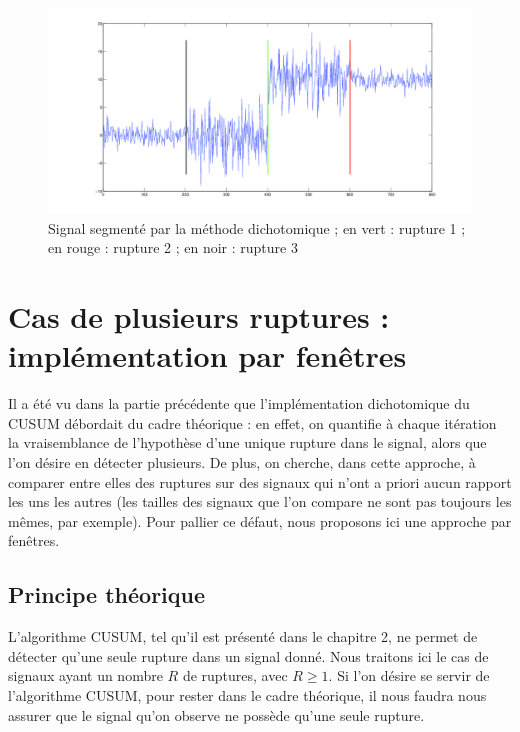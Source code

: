 \documentclass[french,11pt,notitlepage]{report}
\begin{document}
	\begin{figure}[hp]
		\includegraphics[width=\linewidth,height=.24\textheight]{tada_dikt}
		\caption{Signal segmenté par la méthode dichotomique ; en vert : rupture 1 ; en rouge : rupture 2 ; en noir : rupture 3}
		\label{tada_dikt}
	\end{figure}
		
		
		
	\chapter{Cas de plusieurs ruptures : implémentation par fenêtres}	
	
	
	
	Il a été vu dans la partie précédente que l'implémentation dichotomique du CUSUM débordait du cadre théorique :
	en effet, on quantifie à chaque itération la vraisemblance de l'hypothèse d'une unique rupture dans le signal, alors que l'on désire en détecter plusieurs.
	De plus, on cherche, dans cette approche, à comparer entre elles des ruptures sur des signaux qui n'ont a priori aucun rapport les uns les autres (les tailles des signaux que l'on compare ne sont pas toujours les mêmes, par exemple).
	Pour pallier ce défaut, nous proposons ici une approche par fenêtres.
	
	
	\section{Principe théorique}
	
	
	L'algorithme CUSUM, tel qu'il est présenté dans le chapitre 2, ne permet de détecter qu'une seule rupture dans un signal donné.
	Nous traitons ici le cas de signaux ayant un nombre $R$ de ruptures, avec $R \geq 1$.
	Si l'on désire se servir de l'algorithme CUSUM, pour rester dans le cadre théorique,
	il nous faudra nous assurer que le signal qu'on observe ne possède qu'une seule rupture.
	\\
	
\end{document}
